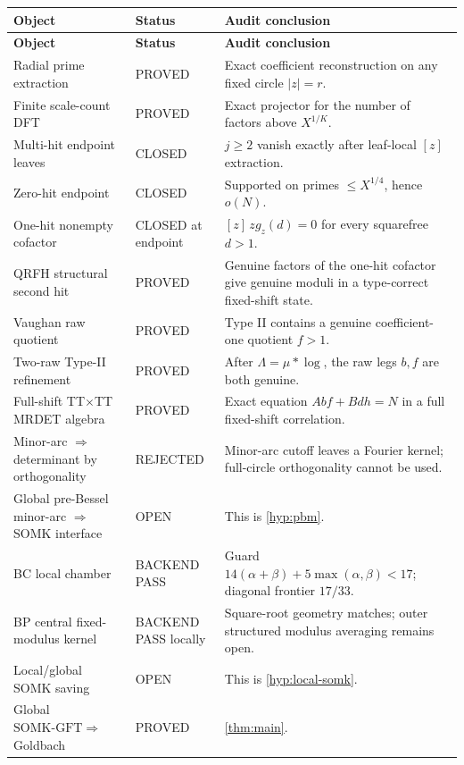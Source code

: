 \documentclass[11pt]{article}
\theoremstyle{definition}
\theoremstyle{remark}
\newcommand{\1}{\mathbf 1}
\newcommand{\SOMK}{\mathrm{SOMK}\text{-}\mathrm{GFT}}
\begin{document}
\begin{center}
\begin{longtable}{>{\raggedright\arraybackslash}p{} >{\raggedright\arraybackslash}p{} >{\raggedright\arraybackslash}p{}}
\toprule
\textbf{Object} & \textbf{Status} & \textbf{Audit conclusion}\\
\midrule
\endfirsthead
\toprule
\textbf{Object} & \textbf{Status} & \textbf{Audit conclusion}\\
\midrule
\endhead
Radial prime extraction & PROVED & Exact coefficient reconstruction on any fixed circle \(|z|=r\).\\
Finite scale-count DFT & PROVED & Exact projector for the number of factors above \(X^{1/K}\).\\
Multi-hit endpoint leaves & CLOSED & \(j\ge2\) vanish exactly after leaf-local \([z]\) extraction.\\
Zero-hit endpoint & CLOSED & Supported on primes \(\le X^{1/4}\), hence \(o(N)\).\\
One-hit nonempty cofactor & CLOSED at endpoint & \([z]\,z g_z(d)=0\) for every squarefree \(d>1\).\\
QRFH structural second hit & PROVED & Genuine factors of the one-hit cofactor give genuine moduli in a type-correct fixed-shift state.\\
Vaughan raw quotient & PROVED & Type II contains a genuine coefficient-one quotient \(f>1\).\\
Two-raw Type-II refinement & PROVED & After \(\Lambda=\mu*\log\), the raw legs \(b,f\) are both genuine.\\
Full-shift TT\(\times\)TT MRDET algebra & PROVED & Exact equation \(Abf+Bdh=N\) in a full fixed-shift correlation.\\
Minor-arc \(\Rightarrow\) determinant by orthogonality & REJECTED & Minor-arc cutoff leaves a Fourier kernel; full-circle orthogonality cannot be used.\\
Global pre-Bessel minor-arc \(\Rightarrow\) SOMK interface & OPEN & This is \cref{hyp:pbm}.\\
BC local chamber & BACKEND PASS & Guard \(14(\alpha+\beta)+5\max(\alpha,\beta)<17\); diagonal frontier \(17/33\).\\
BP central fixed-modulus kernel & BACKEND PASS locally & Square-root geometry matches; outer structured modulus averaging remains open.\\
Local/global SOMK saving & OPEN & This is \cref{hyp:local-somk}.\\
Global \(\SOMK\Rightarrow\) Goldbach & PROVED & \cref{thm:main}.\\
\bottomrule
\end{longtable}
\end{center}
\end{document}
